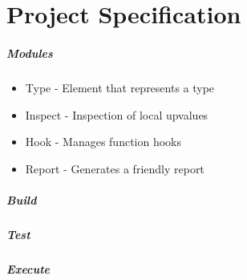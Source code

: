 \chapter{Project Specification}
\label{cha:Project Specification}

\paragraph*{Modules}
\begin{itemize}
    \item Type - Element that represents a type
    \item Inspect - Inspection of local upvalues
    \item Hook - Manages function hooks
    \item Report - Generates a friendly report
\end{itemize}

\paragraph*{Build}

\paragraph*{Test}

\paragraph*{Execute}







